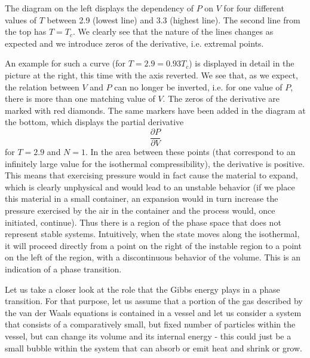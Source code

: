 \documentclass[a4paper, draft]{article}
\theoremstyle{own}
\theoremstyle{remark}
\begin{document}
The diagram on the left displays the dependency of $P$ on $V$ for four different values of $T$ between 2.9 (lowest line) and 3.3 (highest line). The second line from the top has $T = T_c$. We clearly see that the nature of the lines changes as expected and we introduce zeros of the derivative, i.e. extremal points. 

An example for such a curve (for $T=2.9 = 0.93 T_c$) is displayed in detail in the picture at the right, this time with the axis reverted. We see that, as we expect, the relation between $V$ and $P$ can no longer be inverted, i.e. for one value of $P$, there is more than one matching value of $V$. The zeros of the derivative are marked with red diamonds. The same markers have been added in the diagram at the bottom, which displays the partial derivative
$$
\frac{\partial{P}}{\partial V}
$$
for $T=2.9$ and $N=1$. In the area between these points (that correspond to an infinitely large value for the isothermal compressibility), the derivative is positive. This means that exercising pressure would in fact cause the material to expand, which is clearly unphysical and would lead to an unstable behavior  (if we place this material in a small container, an expansion would in turn increase the pressure exercised by the air in the container and the process would, once initiated, continue). Thus there is a region of the phase space that does not represent stable systems. Intuitively, when the state moves along the isothermal, it will proceed directly from a point on the right of the instable region to a point on the left of the region, with a discontinuous behavior of the volume. This is an indication of a phase transition.

Let us take a closer look at the role that the Gibbs energy plays in a phase transition. For that purpose, let us assume that a portion of the gas described by the van der Waals equations is contained in a vessel and let us consider a system that consists of a comparatively small, but fixed number of particles within the vessel, but can change its volume and its internal energy - this could just be a small bubble within the system that can absorb or emit heat and shrink or grow. 
\end{document}
